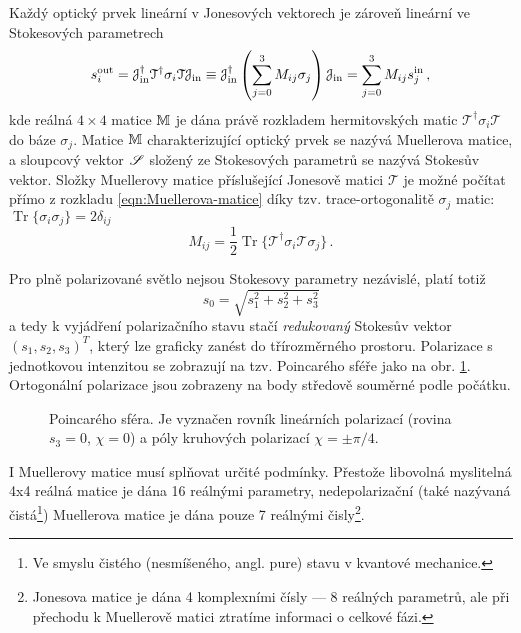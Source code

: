 Každý optický prvek lineární v Jonesových vektorech je zároveň lineární ve Stokesových parametrech
\begin{equation} 
\label{eqn:Muellerova-matice}
s^\textrm{out}_i=\mathcal{J}_\textrm{in}^\dagger \mathcal{T}^\dagger \sigma_i \mathcal{T} \mathcal{J}_\textrm{in}\equiv\mathcal{J}^\dagger_\textrm{in} \left(\sum_{j=0}^{3} M_{ij} \sigma_j \right) \mathcal{J}_\textrm{in}
    =\sum_{j=0}^{3} M_{ij} s^\textrm{in}_j \,,
\end{equation}
kde reálná $4\times 4$ matice $\mathbb{M}$ je dána právě rozkladem hermitovských matic $\mathcal{T}^\dagger \sigma_i \mathcal{T}$ do báze $\sigma_j$.
Matice $\mathbb{M}$ charakterizující optický prvek se nazývá Muellerova matice, a sloupcový vektor $\mathscr{S}$ složený ze Stokesových parametrů se nazývá Stokesův vektor.
Složky Muellerovy matice příslušející Jonesově matici $\mathcal{T}$ je možné počítat přímo z rozkladu \eqref{eqn:Muellerova-matice} díky tzv. trace-ortogonalitě $\sigma_j$ matic: $\operatorname{Tr}\lbrace\sigma_i\sigma_j\rbrace=2\delta_{ij}$
\begin{equation} 
\label{eqn:Mueller-rozklad}
    M_{ij}=\frac{1}{2}\operatorname{Tr}\lbrace \mathcal{T}^\dagger \sigma_i \mathcal{T} \sigma_j \rbrace \,.
\end{equation}

Pro plně polarizované světlo nejsou Stokesovy parametry nezávislé, platí totiž
\begin{equation} 
\label{e:norma S}
    s_0=\sqrt{s_1^2+s_2^2+s_3^2}
\end{equation}
a tedy k vyjádření polarizačního stavu stačí \emph{redukovaný} Stokesův vektor $(s_1, s_2, s_3)^T$, který lze graficky zanést do třírozměrného prostoru.
Polarizace s jednotkovou intenzitou se zobrazují na tzv. Poincarého sféře jako na obr. \ref{fig:Poincareho-sfera}.
Ortogonální polarizace jsou zobrazeny na body středově souměrné podle počátku.

\begin{figure}[htbp]
    \centering
    
    \caption{Poincarého sféra. Je vyznačen rovník lineárních polarizací (rovina $s_3=0$, $\chi=0$) a póly kruhových polarizací $\chi=\pm \pi/4$.}
    \label{fig:Poincareho-sfera}
\end{figure}

I Muellerovy matice musí splňovat určité podmínky.
Přestože libovolná myslitelná 4x4 reálná matice je dána 16 reálnými parametry, nedepolarizační (také nazývaná čistá\footnote{Ve smyslu čistého (nesmíšeného, angl. pure) stavu v kvantové mechanice.}) Muellerova matice je dána pouze 7 reálnými čisly\footnote{Jonesova matice je dána 4 komplexními čísly --- 8 reálných parametrů, ale při přechodu k Muellerově matici ztratíme informaci o celkové fázi.}\cite{ossikovskiDifferentialMatrixFormalism2011}.

